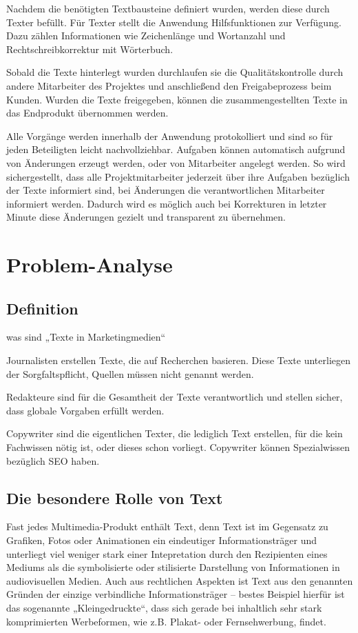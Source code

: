\documentclass[11pt,a4paper]{article}
\begin{document}
Nachdem die benötigten Textbausteine definiert wurden, werden diese durch Texter befüllt. Für Texter stellt die Anwendung Hilfsfunktionen zur Verfügung. Dazu zählen Informationen wie Zeichenlänge und Wortanzahl und Rechtschreibkorrektur mit Wörterbuch.

Sobald die Texte hinterlegt wurden durchlaufen sie die Qualitätskontrolle durch andere Mitarbeiter des Projektes und anschließend den Freigabeprozess beim Kunden. Wurden die Texte freigegeben, können die zusammengestellten Texte in das Endprodukt übernommen werden. 

Alle Vorgänge werden innerhalb der Anwendung protokolliert und sind so für jeden Beteiligten leicht nachvollziehbar. Aufgaben können automatisch aufgrund von Änderungen erzeugt werden, oder von Mitarbeiter angelegt werden. So wird sichergestellt, dass alle Projektmitarbeiter jederzeit über ihre Aufgaben bezüglich der Texte informiert sind, bei Änderungen die verantwortlichen Mitarbeiter informiert werden. Dadurch wird es möglich auch bei Korrekturen in letzter Minute diese Änderungen gezielt und transparent zu übernehmen.

\section{Problem-Analyse}

\subsection{Definition}

was sind „Texte in Marketingmedien“

Journalisten erstellen Texte, die auf Recherchen basieren. Diese Texte unterliegen der Sorgfaltspflicht, Quellen müssen nicht genannt werden. 

Redakteure sind für die Gesamtheit der Texte verantwortlich und stellen sicher, dass globale Vorgaben erfüllt werden.

Copywriter sind die eigentlichen Texter, die lediglich Text erstellen, für die kein Fachwissen nötig ist, oder dieses schon vorliegt. Copywriter können Spezialwissen bezüglich SEO haben.

\subsection{Die besondere Rolle von Text}

Fast jedes Multimedia-Produkt enthält Text, denn Text ist im Gegensatz zu Grafiken, Fotos oder Animationen ein eindeutiger Informationsträger und unterliegt viel weniger stark einer Intepretation durch den Rezipienten eines Mediums als die symbolisierte oder stilisierte Darstellung von Informationen in audiovisuellen Medien. Auch aus rechtlichen Aspekten ist Text aus den genannten Gründen der einzige verbindliche Informationsträger – bestes Beispiel hierfür ist das sogenannte „Kleingedruckte“, dass sich gerade bei inhaltlich sehr stark komprimierten Werbeformen, wie z.B. Plakat- oder Fernsehwerbung, findet.
\end{document}
